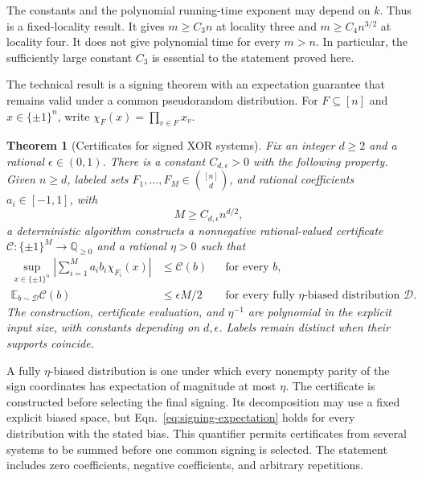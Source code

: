 \documentclass[letterpaper,11pt]{article}
\newtheorem{theorem}{Theorem}
\theoremstyle{definition}
\newcommand{\Q}{\mathbb Q}
\newcommand{\E}{\mathbb E}
\newcommand{\abs}[1]{\left|#1\right|}
\begin{document}
The constants and the polynomial running-time exponent may depend on
$k$. Thus  is a fixed-locality result. It gives
$m\ge C_3n$ at locality three and $m\ge C_4n^{3/2}$ at locality four.
It does not give polynomial time for every $m>n$. In particular,
the sufficiently large constant $C_3$ is essential to the statement
proved here.

The technical result is a signing theorem with an expectation guarantee
that remains valid under a common pseudorandom distribution. For
$F\subseteq[n]$ and $x\in\{\pm1\}^n$, write
$\chi_F(x)=\prod_{v\in F}x_v$.

\begin{theorem}[Certificates for signed XOR systems]
\label{thm:signing}
Fix an integer $d\ge2$ and a rational $\epsilon\in(0,1)$.
There is a constant $C_{d,\epsilon}>0$ with the following property.
Given $n\ge d$, labeled sets $F_1,\ldots,F_M\in\binom{[n]}d$, and rational
coefficients $a_i\in[-1,1]$, with
\begin{equation}
 M\ge C_{d,\epsilon}n^{d/2},
 \label{eq:signing-density}
\end{equation}
a deterministic algorithm constructs a nonnegative rational-valued
certificate $\mathcal C:\{\pm1\}^M\to\Q_{\ge0}$ and a rational
$\eta>0$ such that
\begin{align}
 \sup_{x\in\{\pm1\}^n}
 \abs{\sum_{i=1}^M a_i b_i\chi_{F_i}(x)}
 &\le\mathcal C(b) &&\text{for every }b,\label{eq:signing-soundness}\\
 \E_{b\sim\mathcal D}\mathcal C(b)
 &\le\epsilon M/2
 &&\text{for every fully $\eta$-biased distribution }\mathcal D.
 \label{eq:signing-expectation}
\end{align}
The construction, certificate evaluation, and $\eta^{-1}$ are polynomial
in the explicit input size, with constants depending on $d,\epsilon$.
Labels remain distinct when their supports coincide.
\end{theorem}

A fully $\eta$-biased distribution is one under which every nonempty
parity of the sign coordinates has expectation of magnitude at most
$\eta$. The certificate is constructed before selecting the final
signing. Its decomposition may use a fixed explicit biased space, but
Eqn.~\eqref{eq:signing-expectation} holds for every distribution with
the stated bias. This quantifier permits certificates from several
systems to be summed before one common signing is selected. The
statement includes zero coefficients, negative coefficients, and
arbitrary repetitions.
\end{document}
